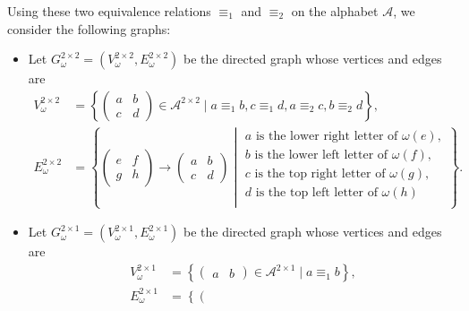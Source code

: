 \documentclass[12pt]{amsart}
\newcommand{\Acal}{\mathcal{A}} %
\begin{document}
Using these two equivalence relations $\equiv_1$ and $\equiv_2$ on the alphabet $\Acal$,
we consider the following graphs:
\begin{itemize}
    \item
Let $G_\omega^{2\times2}=(V_\omega^{2\times2},E_\omega^{2\times2})$ be the
directed graph whose vertices and edges are
\begin{align*}
    V_\omega^{2\times2} &= \left\{
        \left(\begin{smallmatrix}
            a&b\\
            c&d
        \end{smallmatrix}\right)
        \in\Acal^{2\times 2}
        \mid
        a\equiv_1 b,
        c\equiv_1 d,
        a\equiv_2 c,
        b\equiv_2 d
        \right\},\\
    E_\omega^{2\times2} &= \left\{
        \left(\begin{smallmatrix}
            e&f\\
            g&h
        \end{smallmatrix}\right)
        \to
        \left(\begin{smallmatrix}
            a&b\\
            c&d
        \end{smallmatrix}\right)
        \middle|
        \begin{array}{l}
        a \text{ is the lower right letter of } \omega(e),\\
        b \text{ is the lower left letter of }  \omega(f),\\
        c \text{ is the top right letter of }   \omega(g),\\
        d \text{ is the top left letter of }    \omega(h)\\
        \end{array}
        \right\}.
\end{align*}
    \item
Let $G_\omega^{2\times1}=(V_\omega^{2\times1},E_\omega^{2\times1})$ be the
directed graph whose vertices and edges are 
\begin{align*}
    V_\omega^{2\times1} &= \left\{
        \left(\begin{smallmatrix}
            a&b
        \end{smallmatrix}\right)
        \in\Acal^{2\times1}
        \mid
        a\equiv_1 b
        \right\},\\
    E_\omega^{2\times1} &= \left\{
        \left(\begin{smallmatrix}

\end{smallmatrix}
\end{align*}
\end{itemize}
\end{document}
